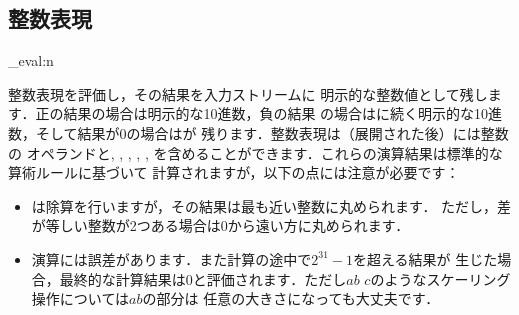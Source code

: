 \documentclass[dvipdfmx,full,kernel]{wtpl3doc}
\begin{document}
\begin{documentation}
\section{整数表現}
%
\begin{function}[EXP]{\int_eval:n}
  \begin{syntax}
     
  \end{syntax}
%
  整数表現を評価し，その結果を入力ストリームに
  明示的な整数値として残します．正の結果の場合は明示的な10進数，負の結果
  の場合は\code{-}に続く明示的な10進数，そして結果が0の場合はが
  残ります．整数表現は（展開された後）には整数の
  オペランドと\code{+}, \code{-}, \code{*}, \code{/}, \code{(}, \code{)}%
  を含めることができます．これらの演算結果は標準的な算術ルールに基づいて
  計算されますが，以下の点には注意が必要です：
%
  \begin{itemize}
%
  \item \code{/}は除算を行いますが，その結果は最も近い整数に丸められます．
    ただし，差が等しい整数が2つある場合は0から遠い方に丸められます．
%
%
  \item 演算には誤差があります．また計算の途中で$2^{31}-1$を超える結果が
    生じた場合，最終的な計算結果は0と評価されます．ただし$a$\code{*}$b$%
    \code{/}$c$のようなスケーリング操作については$a$\code{*}$b$の部分は
    任意の大きさになっても大丈夫です．
%

\end{itemize}
\end{function}
\end{documentation}
\end{document}
